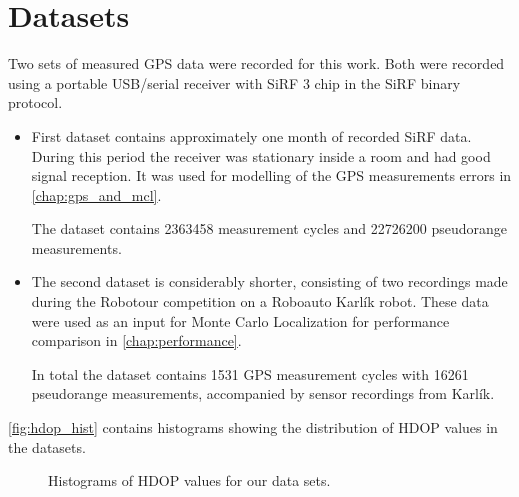 \chapter{Datasets}
\label{chap:datasets}

Two sets of measured GPS data were recorded for this work.
Both were recorded using a portable USB/serial receiver with SiRF 3 chip
in the SiRF binary protocol.

\begin{itemize}

\item
First dataset contains approximately one month of recorded SiRF data.
During this period the receiver was stationary inside a room and had good signal 
reception. 
It was used for modelling of the GPS measurements errors in \autoref{chap:gps_and_mcl}.

The dataset contains \num{2363458} measurement cycles and
\num{22726200} pseudorange measurements.

\item
The second dataset is considerably shorter, consisting of two recordings made during
the Robotour competition \cite{robotour} on a Roboauto Karlík \cite{karlik} robot.
These data were used as an input for Monte Carlo Localization for performance comparison in \autoref{chap:performance}.

In total the dataset contains \num{1531} GPS measurement cycles with
\num{16261} pseudorange measurements, accompanied by sensor recordings from Karlík.
\end{itemize}

\autoref{fig:hdop_hist} contains histograms showing the distribution of HDOP values in the datasets.

\begin{figure}[htp]
	\centering
	
	\caption{Histograms of HDOP values for our data sets.}
	\label{fig:hdop_hist}

\end{figure}


